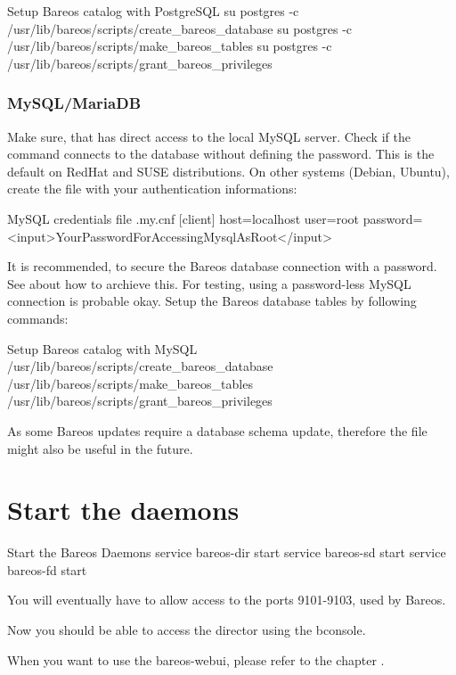\begin{commands}{Setup Bareos catalog with PostgreSQL}
su postgres -c /usr/lib/bareos/scripts/create_bareos_database
su postgres -c /usr/lib/bareos/scripts/make_bareos_tables
su postgres -c /usr/lib/bareos/scripts/grant_bareos_privileges
\end{commands}


\subsubsection{MySQL/MariaDB}
Make sure, that  has direct access to the local MySQL server. 
Check if the command  connects to the database without defining the password.
This is the default on RedHat and SUSE distributions. 
On other systems (Debian, Ubuntu),
create the file  with your authentication informations:

\begin{config}{MySQL credentials file .my.cnf}
[client]
host=localhost
user=root
password=<input>YourPasswordForAccessingMysqlAsRoot</input>
\end{config}

It is recommended, to secure the Bareos database connection with a password.
See  about how to archieve this.
For testing, using a password-less MySQL connection is probable okay.
Setup the Bareos database tables by following commands:
\begin{commands}{Setup Bareos catalog with MySQL}
/usr/lib/bareos/scripts/create_bareos_database
/usr/lib/bareos/scripts/make_bareos_tables
/usr/lib/bareos/scripts/grant_bareos_privileges
\end{commands}

As some Bareos updates require a database schema update,
therefore the file  might also be useful in the future.


\section{Start the daemons}
    \label{sec:StartDaemons}

\begin{commands}{Start the Bareos Daemons}
service bareos-dir start
service bareos-sd start
service bareos-fd start
\end{commands}

You will eventually have to allow access to the ports 9101-9103, used by Bareos.

Now you should be able to access the director using the bconsole.

When you want to use the bareos-webui, please refer to the chapter .
